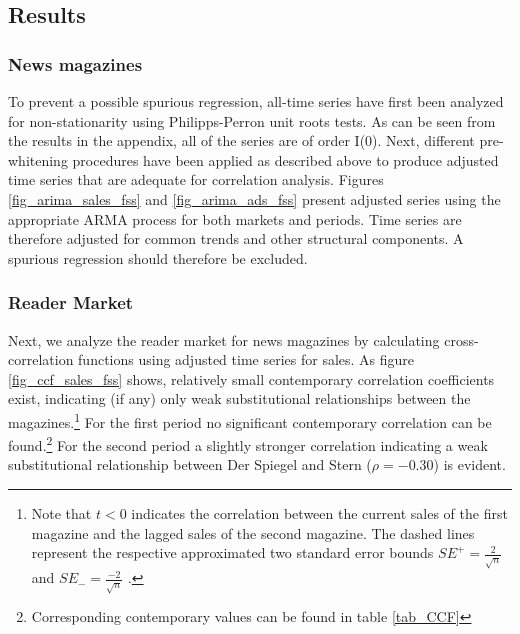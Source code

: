 \documentclass[12pt,a4paper,notitlepage]{article}
\begin{document}

\subsection{Results}

\subsubsection{News magazines}

To prevent a possible spurious regression, all-time series have first been analyzed for non-stationarity using Philipps-Perron unit roots tests. As can be seen from the results in the appendix, all of the series are of order I(0). Next, different pre-whitening procedures have been applied as described above to produce adjusted time series that are adequate for correlation analysis. Figures \ref{fig_arima_sales_fss} and \ref{fig_arima_ads_fss} present adjusted series using the appropriate ARMA process for both markets and periods. Time series are therefore adjusted for common trends and other structural components. A spurious regression should therefore be excluded.  

\subsubsection{Reader Market}

Next, we analyze the reader market for news magazines by calculating cross-correlation functions using adjusted time series for sales. As figure \ref{fig_ccf_sales_fss} shows, relatively small contemporary correlation coefficients exist, indicating (if any) only weak substitutional relationships between the magazines.\footnote{Note that $t<0$ indicates the correlation between the current sales of the first magazine and the lagged sales of the second magazine. The dashed lines represent the respective approximated two standard error bounds $SE^+=\frac{2}{\sqrt{n}}$ and $SE_-=\frac{-2}{\sqrt{n}}$ \citep{tiao_modeling_1981}.} For the first period no significant contemporary correlation can be found.\footnote{Corresponding contemporary values can be found in table \ref{tab_CCF}} For the second period a slightly stronger correlation indicating a weak substitutional relationship between Der Spiegel and Stern ($\rho=-0.30$) is evident.
\end{document}
